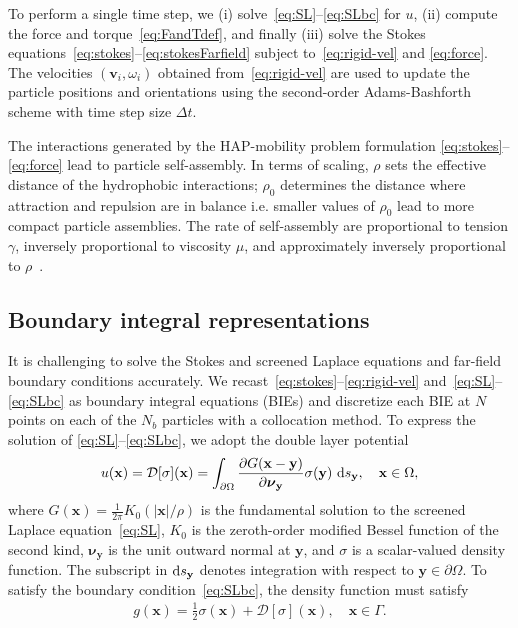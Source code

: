 \documentclass[prb,preprint,showpacs,preprintnumbers,amsmath,amssymb,longbibliography]{revtex4-1}
\newcommand{\DD}{\mathcal{D}}
\newcommand{\nnu}{\boldsymbol{\nu}}
\newcommand{\xx}{\mathbf{x}}
\renewcommand{\vv}{\mathbf{v}}
\newcommand{\yy}{\mathbf{y}}
\newcommand{\pderiv}[2]{\frac{\partial #1}{\partial #2}}
\begin{document}
To perform a single time step, we
(i) solve~\eqref{eq:SL}--\eqref{eq:SLbc} for $u$,
(ii) compute the force and torque~\eqref{eq:FandTdef},
and finally (iii) solve the Stokes equations~\eqref{eq:stokes}--\eqref{eq:stokesFarfield}
subject to~\eqref{eq:rigid-vel} and \eqref{eq:force}. 
The velocities $(\vv_i, \omega_i)$ obtained
from~\eqref{eq:rigid-vel} are used to update the
particle positions and orientations
using the second-order Adams-Bashforth scheme
with time step size $\Delta t.$

The interactions
generated by the HAP-mobility problem formulation
\eqref{eq:stokes}--\eqref{eq:force} lead to particle self-assembly.
In terms of scaling, $\rho$ sets the effective distance of the hydrophobic
interactions; $\rho_0$ determines the distance where attraction and repulsion are in
balance i.e. smaller values of $\rho_0$ lead to more compact particle assemblies.
The rate of self-assembly are proportional to tension $\gamma$,
inversely proportional to viscosity $\mu$, and
approximately inversely proportional to $\rho$~\cite{Fu20}.


\subsection{Boundary integral representations}
It is challenging to solve the Stokes and screened Laplace equations
and far-field boundary conditions accurately. 
We recast~\eqref{eq:stokes}--\eqref{eq:rigid-vel}
and~\eqref{eq:SL}--\eqref{eq:SLbc} as boundary integral equations (BIEs)
and discretize each BIE at $N$ points on each of the $N_b$ particles
with a collocation method. To express the solution of
\eqref{eq:SL}--\eqref{eq:SLbc}, we adopt the double layer potential
\begin{align}
\label{eq:SL_BIE}
u({\xx}) = \DD[\sigma](\xx) = \int_{\partial \Omega} 
  \pderiv{G(\xx-\yy)}{\nnu_\yy}\sigma(\yy)\, \dif s_\yy, 
  \quad \xx \in \Omega,
\end{align}
where $G(\xx) = \frac{1}{2\pi}K_0(|\xx|/\rho)$ is the fundamental
solution to the screened Laplace equation~\eqref{eq:SL}, $K_0$ is the
zeroth-order modified Bessel function of the second kind, $\nnu_\yy$ is
the unit outward normal at $\yy$, and $\sigma$ is a scalar-valued
density function. The subscript in $\dif s_\yy$ denotes integration with
respect to $\yy \in \partial \Omega$. To satisfy the boundary
condition~\eqref{eq:SLbc}, the density function must satisfy\cite{Hsiao2008}
\begin{align}
  \label{eq:SL_BIE2}
  g(\xx) = \frac{1}{2} \sigma(\xx) + \DD[\sigma](\xx), \quad
    \xx \in \Gamma.
\end{align}
\end{document}
